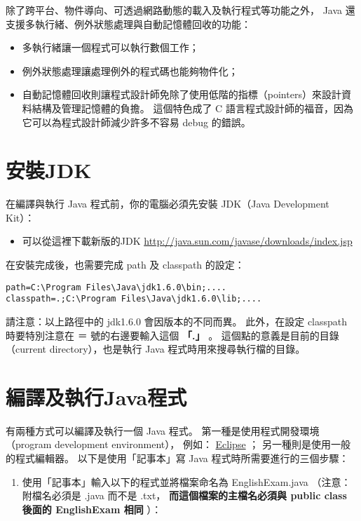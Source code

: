 \documentclass[a4paper,12pt,english]{sphinxmanual}
\begin{document}
除了跨平台、物件導向、可透過網路動態的載入及執行程式等功能之外，
Java 還支援多執行緒、例外狀態處理與自動記憶體回收的功能：
\begin{itemize}
\item {} 
多執行緒讓一個程式可以執行數個工作；

\item {} 
例外狀態處理讓處理例外的程式碼也能夠物件化；

\item {} 
自動記憶體回收則讓程式設計師免除了使用低階的指標（pointers）來設計資料結構及管理記憶體的負擔。
這個特色成了 C 語言程式設計師的福音，因為它可以為程式設計師減少許多不容易 debug 的錯誤。

\end{itemize}


\section{安裝JDK}
\label{java_intro:jdk}
在編譯與執行 Java 程式前，你的電腦必須先安裝 JDK（Java Development Kit）：
\begin{itemize}
\item {} 
可以從這裡下載新版的JDK \href{http://java.sun.com/javase/downloads/index.jsp}{http://java.sun.com/javase/downloads/index.jsp}

\end{itemize}

在安裝完成後，也需要完成 path 及 classpath 的設定：

\begin{Verbatim}[commandchars=@\[\]]
path=C:\Program Files\Java\jdk1.6.0\bin;....
classpath=.;C:\Program Files\Java\jdk1.6.0\lib;....
\end{Verbatim}

請注意：以上路徑中的 jdk1.6.0 會因版本的不同而異。
此外，在設定 classpath 時要特別注意在 ＝ 號的右邊要輸入這個 \textbf{「.」} 。
這個點的意義是目前的目錄（current directory），也是執行 Java 程式時用來搜尋執行檔的目錄。


\section{編譯及執行Java程式}
\label{java_intro:id2}
有兩種方式可以編譯及執行一個 Java 程式。
第一種是使用程式開發環境（program development environment），
例如： \href{http://eclipse.org/}{Eclipse} ；
另一種則是使用一般的程式編輯器。
以下是使用「記事本」寫 Java 程式時所需要進行的三個步驟：
\begin{enumerate}
\item {} 
使用「記事本」輸入以下的程式並將檔案命名為 EnglishExam.java
（注意：附檔名必須是 .java 而不是 .txt，
\textbf{而這個檔案的主檔名必須與 public class 後面的 EnglishExam 相同} ）：

\end{enumerate}
\end{document}
